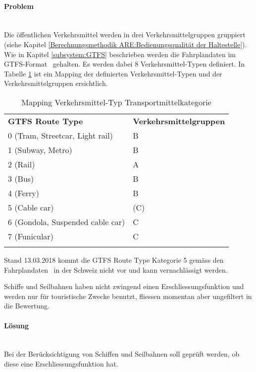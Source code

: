 \paragraph{Problem}~\\
Die öffentlichen Verkehrsmittel werden in drei Verkehrsmittelgruppen gruppiert (siehe Kapitel \ref{Berechnungsmethodik ARE:Bedienungsqualität der Haltestelle}).
Wie in Kapitel \ref{subsystem:GTFS} beschrieben werden die Fahrplandaten im \acs{GTFS}-Format~\cite{gtfs_spec} gehalten. 
Es werden dabei 8 Verkehrsmittel-Typen definiert.
In Tabelle \ref{table:Mapping Verkehrsmittel-Typ Transportmittelkategorie} ist ein Mapping der definierten Verkehrsmittel-Typen und der Verkehrsmittelgruppen ersichtlich.

\begin{longtable}[ht]{l l}
        \midrule
        \textbf{GTFS Route Type} 
                                & \textbf{Verkehrsmittelgruppen}\\
        0 (Tram, Streetcar, Light rail)
                                & B\\
        1 (Subway, Metro)
                                & B\\
        2 (Rail)
                                & A\\
        3 (Bus)
                                & B\\
        4 (Ferry)
                                & B\\
        5 (Cable car)
                                & (C)\\
        6 (Gondola, Suspended cable car)
                                & C\\
        7 (Funicular)
                                & C\\            
        \bottomrule
    \caption{Mapping Verkehrsmittel-Typ Transportmittelkategorie}
    \label{table:Mapping Verkehrsmittel-Typ Transportmittelkategorie}
\end{longtable}

Stand 13.03.2018 kommt die GTFS Route Type Kategorie 5 gemäss den Fahrplandaten~\cite{geops_fahrplandaten} in der Schweiz nicht vor und kann vernachlässigt werden.

Schiffe und Seilbahnen haben nicht zwingend einen Erschliessungsfunktion und werden nur für touristische Zwecke benutzt, fliessen momentan aber ungefiltert in die Bewertung.


\paragraph{Lösung}~\\
Bei der Berücksichtigung von Schiffen und Seilbahnen soll geprüft werden, ob diese eine Erschliessungsfunktion hat.
